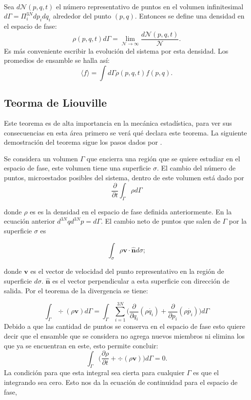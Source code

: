\\
Sea $d\mathcal{N}(p,q,t)$ el número representativo de puntos en el volumen infinitesimal $d\Gamma = \Pi^{3N}_{i}dp_{i}dq_{i}$ alrededor del punto $(p,q)$. Entonces se define una densidad en el espacio de fase:
\begin{equation}
\rho(p,q,t)d\Gamma= \lim_{\mathcal{N} \to \infty} \frac{d\mathcal{N}(p,q,t)}{\mathcal{N}}.
\end{equation}
Es más conveniente escribir la evolución del sistema por esta densidad. Los promedios de ensamble se halla así:
\begin{equation}
\langle f \rangle = \int d\Gamma \rho(p,q,t) f(p,q).
\end{equation}

\subsection{Teorma de Liouville }
Este teorema es de alta importancia en la mecánica estadística, para ver sus consecuencias en esta área primero se verá qué declara este teorema. La siguiente demostración del teorema sigue los pasos dados por \cite{PathriaStat}. 

Se considera un volumen $\Gamma$ que encierra una región que se quiere estudiar en el espacio de fase,  este volumen tiene una superficie $\sigma$. El cambio del número de puntos, microestados posibles del sistema, dentro de este volumen está dado por 
\begin{equation}
\frac{\partial}{\partial t} \int_{\Gamma} \rho d\Gamma
\end{equation}

donde $\rho$ es es la densidad en el espacio de fase definida anteriormente. En la ecuación anterior $d^{3N}q d^{3N}p=d\Gamma$. 
El cambio neto de puntos que salen de $\Gamma$ por la superficie $\sigma$ es

\begin{equation}
\int_{\sigma} \rho \mathbf{v \cdot \hat{n}} d\sigma;
\end{equation}

donde $\mathbf{v}$ es el vector de velocidad del punto representativo en la región de superficie $d\sigma$. $\mathbf{\hat{n}}$ es el vector perpendicular a esta superficie con dirección de salida. Por el teorema de la divergencia se tiene:

\begin{equation}
\int_{\Gamma} \div{ ( \rho\mathbf{v} ) } d\Gamma = \int_{\Gamma} \sum_{i=1}^{3N} \Big( \frac{\partial}{\partial q_{i}}(\rho \dot{q_{i}})+ \frac{\partial}{\partial p_{i}} (\rho \dot{p_{i}}) \Big) d\Gamma
\end{equation}
Debido a que las cantidad de puntos se conserva en el espacio de fase esto quiere decir que el ensamble que se considera no agrega nuevos miembros ni elimina los que ya se encuentran en este, esto permite concluir:
\begin{equation}
 \int_{\Gamma} \Big( \frac{\partial \rho}{\partial t} + \div{ ( \rho\mathbf{v} ) } \Big) d\Gamma =0.
\end{equation}
La condición para que esta integral sea cierta para cualquier $\Gamma$ es que el integrando sea cero. Esto nos da la ecuación de continuidad para el espacio de fase,

